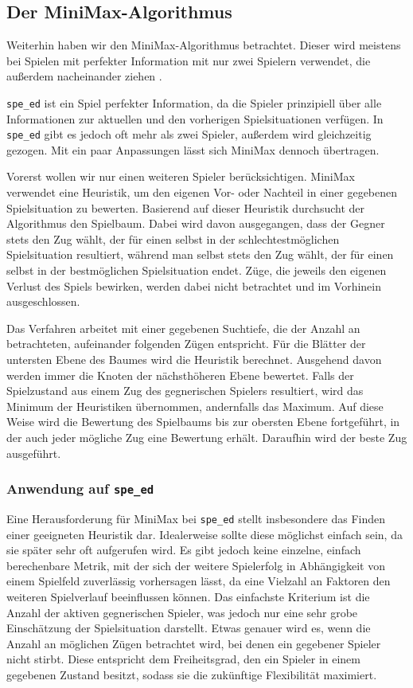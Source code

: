 \documentclass[12pt,a4paper]{article}
\begin{document}
\subsection{Der MiniMax-Algorithmus} \label{sec:minimax}
Weiterhin haben wir den MiniMax-Algorithmus betrachtet.
Dieser wird meistens bei Spielen mit perfekter Information mit nur zwei Spielern verwendet, die außerdem nacheinander ziehen \cite{behnke2020}.

\texttt{spe\_ed} ist ein Spiel perfekter Information, da die Spieler prinzipiell über alle Informationen zur aktuellen und den vorherigen Spielsituationen verfügen. In \texttt{spe\_ed} gibt es jedoch oft mehr als zwei Spieler, außerdem wird gleichzeitig gezogen. Mit ein paar Anpassungen lässt sich MiniMax dennoch übertragen.

Vorerst wollen wir nur einen weiteren Spieler berücksichtigen. MiniMax verwendet eine Heuristik, um den eigenen Vor- oder Nachteil in einer gegebenen Spielsituation zu bewerten. Basierend auf dieser Heuristik durchsucht der Algorithmus den Spielbaum. Dabei wird davon ausgegangen, dass der Gegner stets den Zug wählt, der für einen selbst in der schlechtestmöglichen Spielsituation resultiert, während man selbst stets den Zug wählt, der für einen selbst in der bestmöglichen Spielsituation endet. Züge, die jeweils den eigenen Verlust des Spiels bewirken, werden dabei nicht betrachtet und im Vorhinein ausgeschlossen.

Das Verfahren arbeitet mit einer gegebenen Suchtiefe, die der Anzahl an betrachteten, aufeinander folgenden Zügen entspricht. Für die Blätter der untersten Ebene des Baumes wird die Heuristik berechnet. Ausgehend davon werden immer die Knoten der nächsthöheren Ebene bewertet. Falls der Spielzustand aus einem Zug des gegnerischen Spielers resultiert, wird das Minimum der Heuristiken übernommen, andernfalls das Maximum. Auf diese Weise wird die Bewertung des Spielbaums bis zur obersten Ebene fortgeführt, in der auch jeder mögliche Zug eine Bewertung erhält. Daraufhin wird der beste Zug ausgeführt.

\subsubsection{Anwendung auf \texttt{spe\_ed}}
Eine Herausforderung für MiniMax bei \texttt{spe\_ed} stellt insbesondere das Finden einer geeigneten Heuristik dar.
Idealerweise sollte diese möglichst einfach sein, da sie später sehr oft aufgerufen wird. Es gibt jedoch keine einzelne, einfach berechenbare Metrik, mit der sich der weitere Spielerfolg in Abhängigkeit von einem Spielfeld zuverlässig vorhersagen lässt, da eine Vielzahl an Faktoren den weiteren Spielverlauf beeinflussen können. Das einfachste Kriterium ist die Anzahl der aktiven gegnerischen Spieler, was jedoch nur eine sehr grobe Einschätzung der Spielsituation darstellt. Etwas genauer wird es, wenn die Anzahl an möglichen Zügen betrachtet wird, bei denen ein gegebener Spieler nicht stirbt. Diese entspricht dem Freiheitsgrad, den ein Spieler in einem gegebenen Zustand besitzt, sodass sie die zukünftige Flexibilität maximiert.
\end{document}
